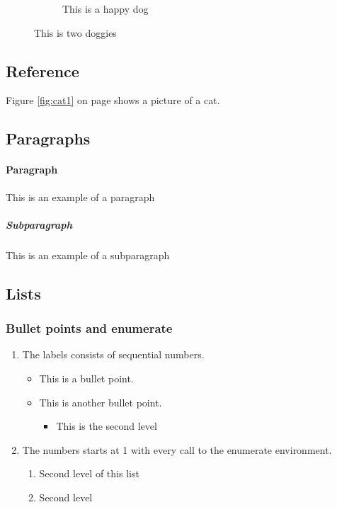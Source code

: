 \documentclass{article}
\begin{document}
\begin{figure}[h]
\begin{subfigure}{0.45\linewidth}
                        \caption{This is a happy dog}
                        \label{fig:figure2}
                    \end{subfigure}
                \caption{This is two doggies}
                \label{fig:thebigpicture}
                \end{figure}
                \FloatBarrier

        \subsection{Reference}

        Figure \ref{fig:cat1} on page \pageref{fig:cat1} shows a picture of a cat.
    
        \newpage
        \subsection{Paragraphs}
                \paragraph{Paragraph}
                This is an example of a paragraph
                    \subparagraph{Subparagraph}
                    This is an example of a subparagraph
        
        \newpage
        \subsection{Lists}
            \subsubsection{Bullet points and enumerate}
            \begin{enumerate}
                \item The labels consists of sequential numbers.
                \begin{itemize}
                    \item This is a bullet point.
                    \item This is another bullet point.
                    \begin{itemize}
                        \item This is the second level
                    \end{itemize}
                \end{itemize}
                \item The numbers starts at 1 with every call to the enumerate environment.
                \begin{enumerate}
                    \item Second level of this list
                    \item Second level
                \end{enumerate}
            \end{enumerate}
                
\end{document}
